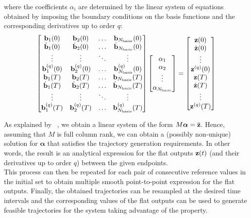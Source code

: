 \documentclass[../main.tex]{subfiles}
\begin{document}
where the coefficients $\alpha_i$ are determined by the linear system of
equations obtained by imposing the boundary conditions on the basis functions
and the corresponding derivatives up to order $q$:
\begin{equation*}
	\begin{bmatrix}
		\mathbf{b}_1(0) & \mathbf{b}_2(0) & \ldots & \mathbf{b}_{N_{\text{basis}}}(0) \\
		\dot{\mathbf{b}}_1(0) & \dot{\mathbf{b}}_2(0) & \ldots & \dot{\mathbf{b}}_{N_{\text{basis}}}(0) \\
		\vdots & \vdots & \ddots & \vdots \\
		\mathbf{b}_1^{(q)}(0) & \mathbf{b}_2^{(q)}(0) & \ldots & \mathbf{b}_{N_{\text{basis}}}^{(q)}(0) \\
		\mathbf{b}_1(T) & \mathbf{b}_2(T) & \ldots & \mathbf{b}_{N_{\text{basis}}}(T) \\
		\dot{\mathbf{b}}_1(T) & \dot{\mathbf{b}}_2(T) & \ldots & \dot{\mathbf{b}}_{N_{\text{basis}}}(T) \\
		\vdots & \vdots & \ddots & \vdots \\
		\mathbf{b}_1^{(q)}(T) & \mathbf{b}_2^{(q)}(T) & \ldots & \mathbf{b}_{N_{\text{basis}}}^{(q)}(T)
	\end{bmatrix}
	\begin{bmatrix}
		\alpha_1 \\ \alpha_2 \\ \vdots \\ \alpha_{N_{\text{basis}}}
	\end{bmatrix}
	=
	\begin{bmatrix}
		\mathbf{z}(0) \\ \dot{\mathbf{z}}(0) \\ \vdots \\ \mathbf{z}^{(q)}(0) \\
		\mathbf{z}(T) \\ \dot{\mathbf{z}}(T) \\ \vdots \\ \mathbf{z}^{(q)}(T)
	\end{bmatrix}
\end{equation*}

As explained by ~\cite{murray}, we obtain a linear system of the
form $M\boldsymbol{\alpha} = \bar{\mathbf{z}}$. Hence, assuming that $M$ is full column rank, we can
obtain a (possibly non-unique) solution for $\boldsymbol{\alpha}$ that satisfies the
trajectory generation requirements.
In other words, the result is an analytical expression for the flat outputs
$\mathbf{z}(t)$ (and their derivatives up to order $q$) between the given
endpoints.\\
This process can then be repeated for each pair of consecutive reference values
in the initial set to obtain multiple smooth point-to-point expression for the
flat outputs. Finally, the obtained trajectories can be resampled at the desired
time intervals and the corresponding values of the flat outputs can be used to
generate feasible trajectories for the system taking advantage of the
 property.
\end{document}
